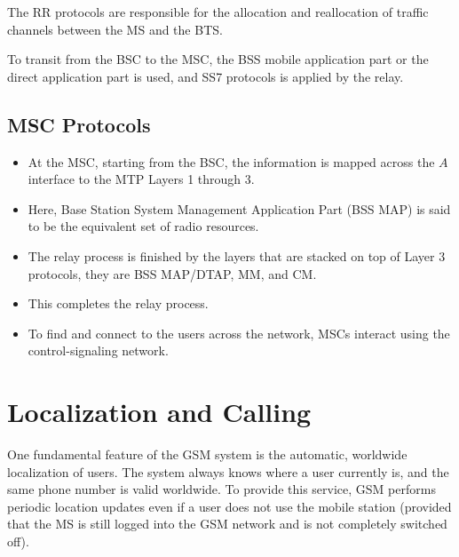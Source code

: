 The RR protocols are responsible for the allocation and reallocation of traffic channels between the MS and the BTS.

To transit from the BSC to the MSC, the BSS mobile application part or the direct application part is used, and SS7 protocols is applied by the relay.

\subsection{MSC Protocols}

\begin{itemize}
	\item At the MSC, starting from the BSC, the information is mapped across the \(A\) interface to the MTP Layers 1 through 3.
	\item Here, Base Station System Management Application Part (BSS MAP) is said to be the equivalent set of radio resources.
	\item The relay process is finished by the layers that are stacked on top of Layer 3 protocols, they are BSS MAP/DTAP, MM, and CM.
	\item This completes the relay process.
	\item To find and connect to the users across the network, MSCs interact using the control-signaling network.
\end{itemize}


\section{Localization and Calling}
One fundamental feature of the GSM system is the automatic, worldwide localization of users. The system always knows where a user currently is, and the same phone number is valid worldwide. To provide this service, GSM performs periodic location updates even if a user does not use the mobile station (provided that the MS is still logged into the GSM network and is not completely switched off). 

